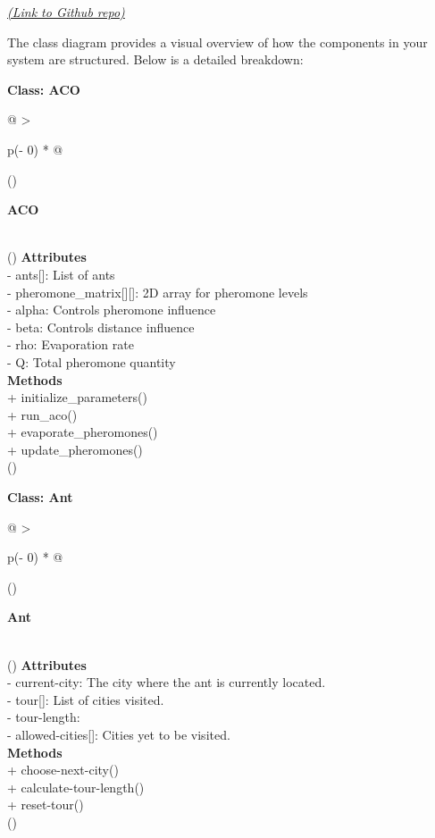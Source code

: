 \documentclass[
]{article}
\begin{document}
\href{https://github.com/darsh0711/AI-DA2}{\textit{(Link to Github repo)}}


The class diagram provides a visual overview of how the components in
your system are structured. Below is a detailed breakdown:

\textbf{Class: ACO}

\begin{longtable}[]{@{}
  >{\raggedright\arraybackslash}p{(\columnwidth - 0\tabcolsep) * }@{}}
\toprule()
\begin{minipage}[b]{\linewidth}\raggedright
\textbf{ACO}
\end{minipage} \\
\midrule()
\endhead
\textbf{Attributes} \\
- ants{[}{]}: List of ants \\
- pheromone\_matrix{[}{]}{[}{]}: 2D array for pheromone levels \\
- alpha: Controls pheromone influence \\
- beta: Controls distance influence \\
- rho: Evaporation rate \\
- Q: Total pheromone quantity \\
\textbf{Methods} \\
+ initialize\_parameters() \\
+ run\_aco() \\
+ evaporate\_pheromones() \\
+ update\_pheromones() \\
\bottomrule()
\end{longtable}

\textbf{Class: Ant}

\begin{longtable}[]{@{}
  >{\raggedright\arraybackslash}p{(\columnwidth - 0\tabcolsep) * }@{}}
\toprule()
\begin{minipage}[b]{\linewidth}\raggedright
\textbf{Ant}
\end{minipage} \\
\midrule()
\endhead
\textbf{Attributes} \\
- current-city: The city where the ant is currently located. \\
- tour[]: List of cities visited. \\
- tour-length:  \\
- allowed-cities[]: Cities yet to be visited. \\
\textbf{Methods} \\
+ choose-next-city() \\
+ calculate-tour-length() \\
+ reset-tour() \\
\bottomrule()
\end{longtable}
\end{document}
